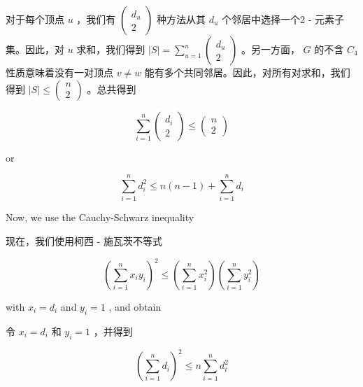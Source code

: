 \documentclass[10pt]{article}
\begin{document}
\begin{tcolorbox}\relax
对于每个顶点 \(u\) ，我们有 \(\left( \begin{matrix} {d}_{u} \\  2 \end{matrix}\right)\) 种方法从其 \({d}_{u}\) 个邻居中选择一个2 - 元素子集。因此，对 \(u\) 求和，我们得到 \(\left| S\right|  = \mathop{\sum }\limits_{{u = 1}}^{n}\left( \begin{matrix} {d}_{u} \\  2 \end{matrix}\right)\) 。另一方面， \(G\) 的不含 \({C}_{4}\) 性质意味着没有一对顶点 \(v \neq  w\) 能有多个共同邻居。因此，对所有对求和，我们得到 \(\left| S\right|  \leq  \left( \begin{array}{l} n \\  2 \end{array}\right)\) 。总共得到
\end{tcolorbox}

\[
\mathop{\sum }\limits_{{i = 1}}^{n}\left( \begin{matrix} {d}_{i} \\  2 \end{matrix}\right)  \leq  \left( \begin{array}{l} n \\  2 \end{array}\right)
\]

or

\[
\mathop{\sum }\limits_{{i = 1}}^{n}{d}_{i}^{2} \leq  n\left( {n - 1}\right)  + \mathop{\sum }\limits_{{i = 1}}^{n}{d}_{i} \tag{2.4}
\]

Now, we use the Cauchy-Schwarz inequality

\begin{tcolorbox}\relax
现在，我们使用柯西 - 施瓦茨不等式
\end{tcolorbox}

\[
{\left( \mathop{\sum }\limits_{{i = 1}}^{n}{x}_{i}{y}_{i}\right) }^{2} \leq  \left( {\mathop{\sum }\limits_{{i = 1}}^{n}{x}_{i}^{2}}\right) \left( {\mathop{\sum }\limits_{{i = 1}}^{n}{y}_{i}^{2}}\right)
\]

with \({x}_{i} = {d}_{i}\) and \({y}_{i} = 1\) , and obtain

\begin{tcolorbox}\relax
令 \({x}_{i} = {d}_{i}\) 和 \({y}_{i} = 1\) ，并得到
\end{tcolorbox}

\[
{\left( \mathop{\sum }\limits_{{i = 1}}^{n}{d}_{i}\right) }^{2} \leq  n\mathop{\sum }\limits_{{i = 1}}^{n}{d}_{i}^{2}
\]
\end{document}
